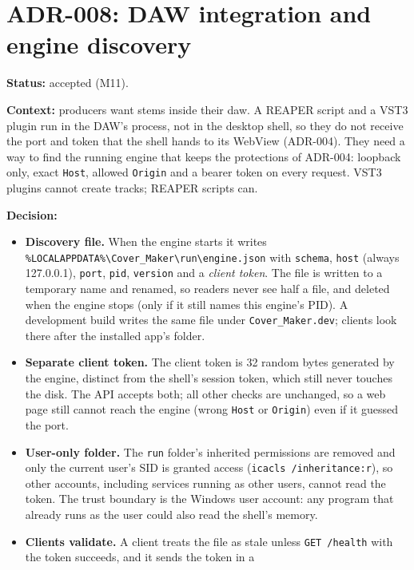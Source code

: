 \section{ADR-008: DAW integration and engine discovery}
\textbf{Status:} accepted (M11).

\textbf{Context:} producers want stems inside their \gls{daw}. A REAPER script
and a VST3 plugin run in the DAW's process, not in the desktop shell, so they do
not receive the port and token that the shell hands to its WebView (ADR-004).
They need a way to find the running engine that keeps the protections of
ADR-004: loopback only, exact \texttt{Host}, allowed \texttt{Origin} and a bearer
token on every request. VST3 plugins cannot create tracks; REAPER scripts can.

\textbf{Decision:}
\begin{itemize}
  \item \textbf{Discovery file.} When the engine starts it writes
        \texttt{\%LOCALAPPDATA\%\textbackslash Cover\_Maker\textbackslash run\textbackslash engine.json} with
        \texttt{schema}, \texttt{host} (always 127.0.0.1), \texttt{port},
        \texttt{pid}, \texttt{version} and a \emph{client token}. The file is
        written to a temporary name and renamed, so readers never see half a
        file, and deleted when the engine stops (only if it still names this
        engine's PID). A development build writes the same file under
        \texttt{Cover\_Maker.dev}; clients look there after the installed
        app's folder.
  \item \textbf{Separate client token.} The client token is 32 random bytes
        generated by the engine, distinct from the shell's session token, which
        still never touches the disk. The API accepts both; all other checks are
        unchanged, so a web page still cannot reach the engine (wrong
        \texttt{Host} or \texttt{Origin}) even if it guessed the port.
  \item \textbf{User-only folder.} The \texttt{run} folder's inherited permissions
        are removed and only the current user's SID is granted access
        (\texttt{icacls /inheritance:r}), so other accounts, including services
        running as other users, cannot read the token. The trust boundary is the
        Windows user account: any program that already runs as the user could
        also read the shell's memory.
  \item \textbf{Clients validate.} A client treats the file as stale unless
        \texttt{GET /health} with the token succeeds, and it sends the token in a

\end{itemize}
